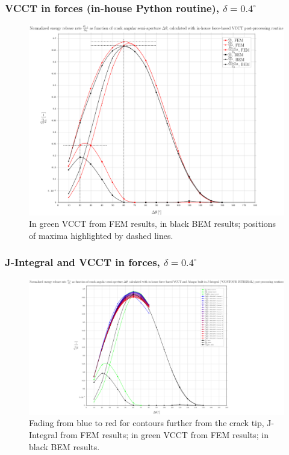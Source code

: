 \documentclass[first,firstsupp,lastsupp,handout,last,hyperref,table]{ETHclass}
\begin{document}
\begin{frame}
\frametitle{\small VCCT in forces (in-house Python routine), $\delta=0.4^{\circ}$}
\vspace{-0.5cm}
\centering
\captionsetup[figure]{font=scriptsize,labelfont=scriptsize}
\begin{figure}[!h]
\centering
\includegraphics[height=0.7\textheight]{2017-07-10_AbqRunSummary_SmallStrainD04_M-F-VCCT_Summary.pdf}
  \caption{\scriptsize In green VCCT from FEM results, in black BEM results; positions of maxima highlighted by dashed lines.}
  \label{fig:res1}
\end{figure}
\end{frame}

\begin{frame}
\frametitle{\small J-Integral and VCCT in forces, $\delta=0.4^{\circ}$}
\vspace{-0.5cm}
\centering
\captionsetup[figure]{font=scriptsize,labelfont=scriptsize}
\begin{figure}[!h]
\centering
\includegraphics[height=0.7\textheight]{2017-07-10_AbqRunSummary_SmallStrainD04_F-VCCT-JINT_Summary.pdf}
  \caption{\scriptsize Fading from blue to red for contours further from the crack tip, J-Integral from FEM results; in green VCCT from FEM results; in black BEM results.}
  \label{fig:res1}
\end{figure}
\end{frame}
\end{document}
